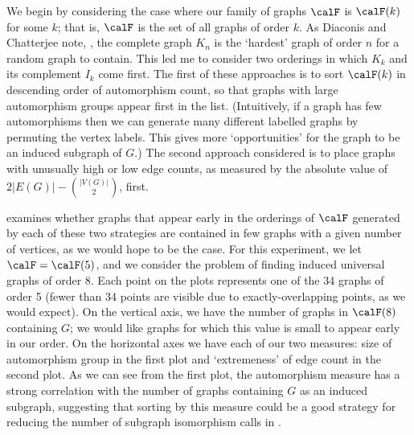 We begin by considering the case where our family of graphs $\calF$
is $\calF(k)$ for some $k$; that is,
$\calF$ is the set of all graphs of order $k$.
As Diaconis and Chatterjee note, \cite{chatterjee2021isomorphisms}, the complete
graph $K_n$ is the `hardest' graph of order $n$ for a random graph to contain.
This led me
to consider two orderings in which $K_k$ and its complement $I_k$ come
first.  The first of these approaches is to sort $\calF(k)$ in descending
order of automorphism count, so that
graphs with large automorphism groups appear first in the list.  (Intuitively, if a graph
has few automorphisms then we can generate many different labelled graphs
by permuting the vertex labels.  This gives more `opportunities' for the
graph to be an induced subgraph of $G$.)
The second approach considered is to place graphs
with unusually high or low edge counts, as measured by the absolute value of
${2|E(G)| - {|V(G)| \choose 2}}$, first.

 examines whether graphs that appear early in the orderings
of $\calF$
generated by each of these two strategies are contained in few graphs with
a given number of vertices, as we would hope to be the case.
For this experiment, we let $\calF = \calF(5)$, and we consider the problem
of finding induced universal graphs of order 8.
Each point on the plots
represents one of the 34 graphs of order 5 (fewer than 34 points are visible
due to exactly-overlapping points, as we would expect).  On the vertical
axis, we have the number of graphs in $\calF(8)$ containing $G$; we would like
graphs for which this value is small to appear early in our order.
On the horizontal axes we have each of our two measures: size of automorphism group
in the first plot and `extremeness' of edge count in the second plot.
As we can see from the first plot, the automorphism measure has a strong correlation
with the number of graphs containing $G$ as an induced subgraph, suggesting that
sorting by this measure could be a good strategy for reducing the number of
subgraph isomorphism calls in .

